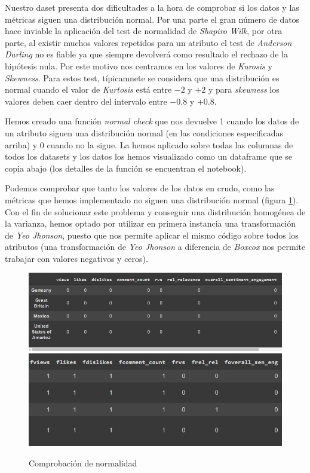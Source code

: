 \documentclass[a4paper,12pt]{article}
\begin{document}
Nuestro daset presenta dos dificultades a la hora de comprobar si los datos y las m\'etricas siguen una distribuci\'on normal. Por una parte el gran n\'umero de datos hace inviable la aplicaci\'on del test de normalidad de {\itshape  Shapiro Wilk}, por otra parte, al existir muchos valores repetidos para un atributo el test de {\itshape Anderson Darling} no es fiable ya que siempre devolver\'a como resultado el rechazo de la hip\'otesis nula. Por este motivo nos centramos en los valores de {\itshape Kurosis} y {\itshape Skewness}. Para estos test, t\'ipicamnete se considera que una distribuci\'on es normal cuando el valor de {\itshape Kurtosis} est\'a entre $-2$ y $+2$ y para {\itshape skewness} los valores deben caer dentro del intervalo entre $-0.8$ y $+0.8$.

Hemos creado una funci\'on {\itshape normal check} que nos devuelve 1 cuando los datos de un atributo siguen una distribuci\'on normal (en las condiciones especificadas arriba) y 0 cuando no la sigue. La hemos aplicado sobre todas las columnas de todos los datasets y los datos los hemos visualizado como un dataframe que se copia abajo (los detalles de la funci\'on se encuentran el notebook).

Podemos comprobar que tanto los valores de los datos en crudo, como las m\'etricas que hemos implementado no siguen una distribuci\'on normal (figura \ref{fig:norm_1}). Con el fin de solucionar este problema y conseguir una distribuci\'on homog\'enea de la varianza, hemos optado por utilizar en primera instancia una transformaci\'on de {\itshape Yeo Jhonson}, puesto que nos permite aplicar el mismo c\'odigo sobre todos los atributos (una transformaci\'on de {\itshape Yeo Jhonson} a diferencia de {\itshape Boxcox} nos permite trabajar con valores negativos y ceros).




\begin{figure}
\centering
\includegraphics[width=12cm]{dataframe_1.JPG}
\includegraphics[width=12cm]{dataframe_2.JPG}
\caption{Comprobaci\'on de normalidad}
\label{fig:norm_1}
\end{figure}
 
\end{document}
